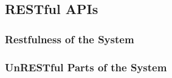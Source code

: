 \subsection{RESTful APIs}

\subsubsection{Restfulness of the System}

\subsubsection{UnRESTful Parts of the System}